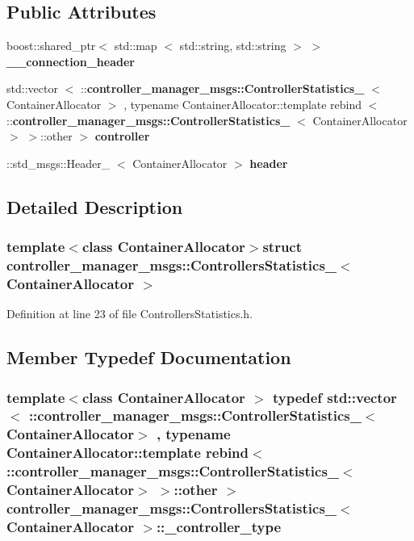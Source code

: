 \subsection*{\-Public \-Attributes}
\begin{DoxyCompactItemize}
\item 
boost\-::shared\-\_\-ptr$<$ std\-::map\*
$<$ std\-::string, std\-::string $>$ $>$ {\bf \-\_\-\-\_\-connection\-\_\-header}
\item 
std\-::vector\*
$<$ \-::{\bf controller\-\_\-manager\-\_\-msgs\-::\-Controller\-Statistics\-\_\-}\*
$<$ \-Container\-Allocator $>$\*
, typename \*
\-Container\-Allocator\-::template \*
rebind\*
$<$ \-::{\bf controller\-\_\-manager\-\_\-msgs\-::\-Controller\-Statistics\-\_\-}\*
$<$ \-Container\-Allocator $>$\*
 $>$\-::other $>$ {\bf controller}
\item 
\-::std\-\_\-msgs\-::\-Header\-\_\-\*
$<$ \-Container\-Allocator $>$ {\bf header}
\end{DoxyCompactItemize}


\subsection{\-Detailed \-Description}
\subsubsection*{template$<$class Container\-Allocator$>$struct controller\-\_\-manager\-\_\-msgs\-::\-Controllers\-Statistics\-\_\-$<$ Container\-Allocator $>$}



\-Definition at line 23 of file \-Controllers\-Statistics.\-h.



\subsection{\-Member \-Typedef \-Documentation}
\subsubsection[{\-\_\-controller\-\_\-type}]{\setlength{\rightskip}{0pt plus 5cm}template$<$class Container\-Allocator $>$ typedef std\-::vector$<$ \-::{\bf controller\-\_\-manager\-\_\-msgs\-::\-Controller\-Statistics\-\_\-}$<$\-Container\-Allocator$>$ , typename \-Container\-Allocator\-::template rebind$<$ \-::{\bf controller\-\_\-manager\-\_\-msgs\-::\-Controller\-Statistics\-\_\-}$<$\-Container\-Allocator$>$ $>$\-::other $>$ {\bf controller\-\_\-manager\-\_\-msgs\-::\-Controllers\-Statistics\-\_\-}$<$ \-Container\-Allocator $>$\-::{\bf \-\_\-controller\-\_\-type}}\label{structcontroller__manager__msgs_1_1ControllersStatistics___a4ed884ab49060aa79f833dcd09a0a9ef}


